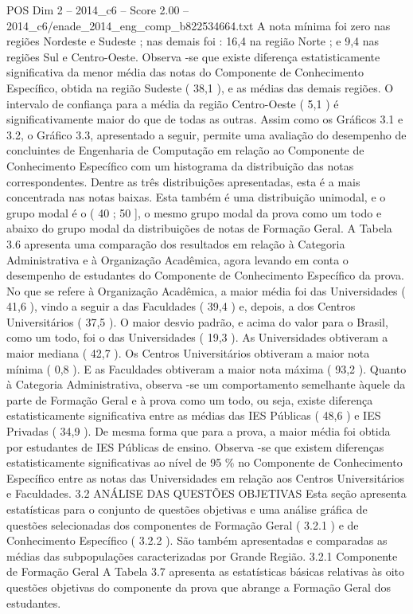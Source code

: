 \begin{textsample}{POS Dim 2 – 2014\_c6 – Score 2.00 – 2014\_c6/enade\_2014\_eng\_comp\_b822534664.txt}
A nota mínima foi zero nas regiões Nordeste e Sudeste ; nas demais foi : 16,4 na região Norte ; e 9,4 nas regiões Sul e Centro-Oeste.
Observa -se que existe diferença estatisticamente significativa da menor média das notas do Componente de Conhecimento Específico, obtida na região Sudeste ( 38,1 ), e as médias das demais regiões.
O intervalo de confiança para a média da região Centro-Oeste ( 5,1 ) é significativamente maior do que de todas as outras.
Assim como os Gráficos 3.1 e 3.2, o Gráfico 3.3, apresentado a seguir, permite uma avaliação do desempenho de concluintes de Engenharia de Computação em relação ao Componente de Conhecimento Específico com um histograma da distribuição das notas correspondentes.
Dentre as três distribuições apresentadas, esta é a mais concentrada nas notas baixas.
Esta também é uma distribuição unimodal, e o grupo modal é o ( 40 ; 50 ], o mesmo grupo modal da prova como um todo e abaixo do grupo modal da distribuições de notas de Formação Geral.
A Tabela 3.6 apresenta uma comparação dos resultados em relação à Categoria Administrativa e à Organização Acadêmica, agora levando em conta o desempenho de estudantes do Componente de Conhecimento Específico da prova.
No que se refere à Organização Acadêmica, a maior média foi das Universidades ( 41,6 ), vindo a seguir a das Faculdades ( 39,4 ) e, depois, a dos Centros Universitários ( 37,5 ).
O maior desvio padrão, e acima do valor para o Brasil, como um todo, foi o das Universidades ( 19,3 ).
As Universidades obtiveram a maior mediana ( 42,7 ).
Os Centros Universitários obtiveram a maior nota mínima ( 0,8 ).
E as Faculdades obtiveram a maior nota máxima ( 93,2 ).
Quanto à Categoria Administrativa, observa -se um comportamento semelhante àquele da parte de Formação Geral e à prova como um todo, ou seja, existe diferença estatisticamente significativa entre as médias das IES Públicas ( 48,6 ) e IES Privadas ( 34,9 ).
De mesma forma que para a prova, a maior média foi obtida por estudantes de IES Públicas de ensino.
Observa -se que existem diferenças estatisticamente significativas ao nível de 95 \% no Componente de Conhecimento Específico entre as notas das Universidades em relação aos Centros Universitários e Faculdades. 3.2 ANÁLISE DAS QUESTÕES OBJETIVAS Esta seção apresenta estatísticas para o conjunto de questões objetivas e uma análise gráfica de questões selecionadas dos componentes de Formação Geral ( 3.2.1 ) e de Conhecimento Específico ( 3.2.2 ).
São também apresentadas e comparadas as médias das subpopulações caracterizadas por Grande Região. 3.2.1 Componente de Formação Geral A Tabela 3.7 apresenta as estatísticas básicas relativas às oito questões objetivas do componente da prova que abrange a Formação Geral dos estudantes.

\end{textsample}
